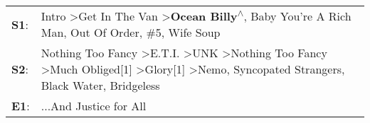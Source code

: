 \begin{supertabular}{p{0.03\textwidth}p{0.92\textwidth}}
 \textbf{S1}:  &                                                                                                                                                           Intro\textsuperscript{} \textgreater \enspace Get In The Van\textsuperscript{} \textgreater \enspace \textbf{Ocean Billy\textsuperscript{$\wedge$}}, \enspace Baby You're A Rich Man\textsuperscript{}, \enspace Out Of Order\textsuperscript{}, \enspace \#5\textsuperscript{}, \enspace Wife Soup\textsuperscript{}  \enspace  \\
 \textbf{S2}:  &  Nothing Too Fancy\textsuperscript{} \textgreater \enspace E.T.I.\textsuperscript{} \textgreater \enspace UNK\textsuperscript{} \textgreater \enspace Nothing Too Fancy\textsuperscript{} \textgreater \enspace Much Obliged[1]\textsuperscript{} \textgreater \enspace Glory[1]\textsuperscript{} \textgreater \enspace Nemo\textsuperscript{}, \enspace Syncopated Strangers\textsuperscript{}, \enspace Black Water\textsuperscript{}, \enspace Bridgeless\textsuperscript{}  \enspace  \\
 \textbf{E1}:  &                                                                                                                                                                                                                                                                                                                                                                                                                                        ...And Justice for All\textsuperscript{}  \enspace  \\
\end{supertabular}
